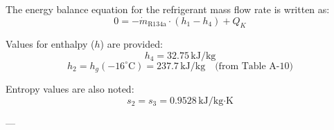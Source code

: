 The energy balance equation for the refrigerant mass flow rate is written as:  
\[
0 = -\dot{m}_{\text{R134a}} \cdot \left( h_1 - h_4 \right) + Q_K
\]  

Values for enthalpy (\(h\)) are provided:  
\[
h_4 = 32.75 \, \text{kJ/kg}
\]  
\[
h_2 = h_g(-16^\circ\text{C}) = 237.7 \, \text{kJ/kg} \quad \text{(from Table A-10)}
\]  

Entropy values are also noted:  
\[
s_2 = s_3 = 0.9528 \, \text{kJ/kg·K}
\]  

---